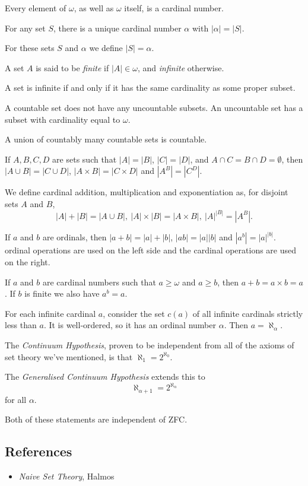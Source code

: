 \begin{prop}
  Every element of $\omega$, as well as $\omega$ itself, is a cardinal number.
\end{prop}
\begin{prop}
  For any set $S$, there is a unique cardinal number $\alpha$ with
  $|\alpha|=|S|$.
\end{prop}
\begin{defn}
  For these sets $S$ and $\alpha$ we define $|S|=\alpha$.
\end{defn}
\begin{defn}
  A set $A$ is said to be \emph{finite} if $|A|\in\omega$, and \emph{infinite}
  otherwise.
\end{defn}
\begin{prop}
  A set is infinite if and only if it has the same cardinality as some proper
  subset.
\end{prop}
\begin{prop}
  A countable set does not have any uncountable subsets. An uncountable set has
  a subset with cardinality equal to $\omega$.
\end{prop}
\begin{prop}
  A union of countably many countable sets is countable.
\end{prop}
\begin{prop}
  If $A,B,C,D$ are sets such that $|A|=|B|$, $|C|=|D|$, and $A\cap C=B\cap
  D=\emptyset$, then $|A\cup B|=|C\cup D|$, $|A\times B|=|C\times D|$ and
  $|A^B|=|C^D|$.
\end{prop}
\begin{defn}
  We define cardinal addition, multiplication and exponentiation as, for
  disjoint sets $A$ and $B$,
  \[|A|+|B|=|A\cup B|,\ |A|\times|B|=|A\times B|,\ |A|^{|B|}=|A^B|.\]
\end{defn}
\begin{prop}
  If $a$ and $b$ are ordinals, then $|a+b|=|a|+|b|$, $|ab|=|a||b|$ and
  $|a^b|=|a|^{|b|}$. 
  ordinal operations are used on the left side and the cardinal operations are
  used on the right.
\end{prop}
\begin{prop}
  If $a$ and $b$ are cardinal numbers such that $a\ge\omega$ and $a\ge b$,
  then $a+b=a\times b=a$. If $b$ is finite we also have $a^b=a$.
\end{prop}
\begin{defn}
  For each infinite cardinal $a$, consider the set $c(a)$ of all infinite
  cardinals strictly less than $a$. It is well-ordered, so it has an ordinal
  number $\alpha$. Then $a=\aleph_{\alpha}$.
\end{defn}
\begin{rem}
  The \emph{Continuum Hypothesis}, proven to be independent from all of the
  axioms of set theory we've mentioned, is that $\aleph_1=2^{\aleph_0}$.

  The \emph{Generalised Continuum Hypothesis} extends this to 
  \[\aleph_{\alpha+1}=2^{\aleph_\alpha}\] for all $\alpha$.

  Both of these statements are independent of ZFC\@.
\end{rem}
\subsection*{References}
\begin{itemize}
  \item \emph{Naive Set Theory}, Halmos
\end{itemize}
